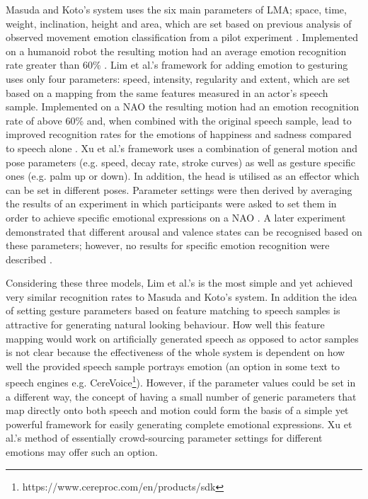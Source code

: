 \documentclass[11pt,a4paper]{report}
\begin{document}
Masuda and Koto's system uses the six main parameters of LMA; space, time, weight, inclination, height and area, which are set based on previous analysis of observed movement emotion classification from a pilot experiment \cite{masuda2009emotion}. Implemented on a humanoid robot the resulting motion had an average emotion recognition rate greater than 60\% \cite{masuda2010motion}. Lim et al.'s framework for adding emotion to gesturing uses only four parameters: speed, intensity, regularity and extent, which are set based on a mapping from the same features measured in an actor's speech sample. Implemented on a NAO the resulting motion had an emotion recognition rate of above 60\% and, when combined with the original speech sample, lead to improved recognition rates for the emotions of happiness and sadness compared to speech alone \cite{lim2011converting}. Xu et al.'s framework uses a combination of general motion and pose parameters (e.g. speed, decay rate, stroke curves) as well as gesture specific ones (e.g. palm up or down). In addition, the head is utilised as an effector which can be set in different poses. Parameter settings were then derived by averaging the results of an experiment in which participants were asked to set them in order to achieve specific emotional expressions on a NAO \cite{xu2013mood}. A later experiment demonstrated that different arousal and valence states can be recognised based on these parameters; however, no results for specific emotion recognition were described \cite{xu2013bodily}.

Considering these three models, Lim et al.'s is the most simple and yet achieved very similar recognition rates to Masuda and Koto's system. In addition the idea of setting gesture parameters based on feature matching to speech samples is attractive for generating natural looking behaviour. How well this feature mapping would work on artificially generated speech as opposed to actor samples is not clear because the effectiveness of the whole system is dependent on how well the provided speech sample portrays emotion (an option in some text to speech engines e.g. CereVoice\footnote{https://www.cereproc.com/en/products/sdk}). However, if the parameter values could be set in a different way, the concept of having a small number of generic parameters that map directly onto both speech and motion could form the basis of a simple yet powerful framework for easily generating complete emotional expressions. Xu et al.'s method of essentially crowd-sourcing parameter settings for different emotions may offer such an option. 
\end{document}
